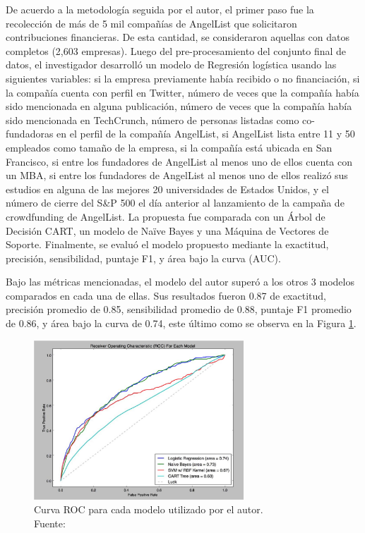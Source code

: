 De acuerdo a la metodología seguida por el autor, el primer paso fue la recolección de más de 5 mil compañías de AngelList que solicitaron contribuciones financieras. De esta cantidad, se consideraron aquellas con datos completos (2,603 empresas). Luego del pre-procesamiento del conjunto final de datos, el investigador desarrolló un modelo de Regresión logística usando las siguientes variables: si la empresa previamente había recibido o no financiación, si la compañía cuenta con perfil en Twitter, número de veces que la compañía había sido mencionada en alguna publicación, número de veces que la compañía había sido mencionada en TechCrunch, número de personas listadas como co-fundadoras en el perfil de la compañía AngelList, si AngelList lista entre 11 y 50 empleados como tamaño de la empresa, si la compañía está ubicada en San Francisco, si entre los fundadores de AngelList al menos uno de ellos cuenta con un MBA, si entre los fundadores de AngelList al menos uno de ellos realizó sus estudios en alguna de las mejores 20 universidades de Estados Unidos, y el número de cierre del S\&P 500 el día anterior al lanzamiento de la campaña de crowdfunding de AngelList. La propuesta fue comparada con un Árbol de Decisión CART, un modelo de Naïve Bayes y una Máquina de Vectores de Soporte. Finalmente, se evaluó el modelo propuesto mediante la exactitud, precisión, sensibilidad, puntaje F1, y área bajo la curva (AUC).

Bajo las métricas mencionadas, el modelo del autor superó a los otros 3 modelos comparados en cada una de ellas. Sus resultados fueron 0.87 de exactitud, precisión promedio de 0.85, sensibilidad promedio de 0.88, puntaje F1 promedio de 0.86, y área bajo la curva de 0.74, este último como se observa en la Figura \ref{2:fig115}.

\begin{figure}[!ht]
	\begin{center}
		\includegraphics[width=0.70\textwidth]{2/figures/beckwith2016.jpg}
		\caption[Curva ROC para cada modelo utilizado por el autor]{Curva ROC para cada modelo utilizado por el autor.\\
		Fuente: \cite{pr_beckwith2016predcrowd}}
		\label{2:fig115}
	\end{center}
\end{figure}

